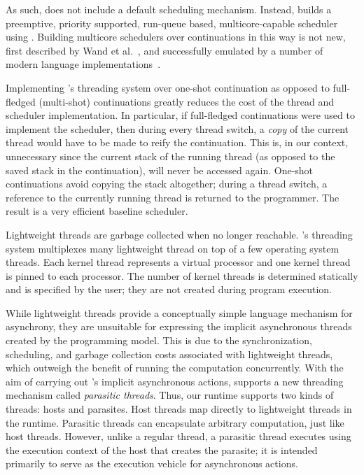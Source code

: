 As such,  does not include a default scheduling mechanism.
Instead, \MM builds a preemptive, priority supported, run-queue based,
multicore-capable scheduler using . Building multicore
schedulers over continuations in this way is not new, first described by Wand
et al.~\cite{ContMP}, and successfully emulated by a number of modern language
implementations~\cite{ghc,Auhagen11}.

Implementing \MM's threading system over one-shot continuation as opposed to
full-fledged (multi-shot) continuations greatly reduces the cost of the thread
and scheduler implementation. In particular, if full-fledged continuations were
used to implement the scheduler, then during every thread switch, a
\emph{copy} of the current thread would have to be made to reify the
continuation. This is, in our context, unnecessary since the current stack of
the running thread (as opposed to the saved stack in the continuation), will
never be accessed again.  One-shot continuations avoid
copying the stack altogether; during a thread switch, a reference to the
currently running thread is returned to the programmer. The result is a very
efficient baseline scheduler.

Lightweight threads are garbage collected when no longer reachable. \MM's
threading system multiplexes many lightweight thread on top of a few operating
system threads. Each kernel thread represents a virtual processor and one
kernel thread is pinned to each processor. The number of kernel threads is
determined statically and is specified by the user; they are not created during
program execution.

While lightweight threads provide a conceptually simple language mechanism for
asynchrony, they are unsuitable for expressing the implicit asynchronous
threads created by the \acml programming model. This is due to the
synchronization, scheduling, and garbage collection costs associated with
lightweight threads, which outweigh the benefit of running the computation
concurrently. With the aim of carrying out \acml's implicit asynchronous
actions, \MM supports a new threading mechanism called \emph{parasitic
threads}. Thus, our runtime supports two kinds of threads: hosts and parasites.
Host threads map directly to lightweight threads in the runtime. Parasitic
threads can encapsulate arbitrary computation, just like host threads. However,
unlike a regular thread, a parasitic thread executes using the execution
context of the host that creates the parasite; it is intended primarily to
serve as the execution vehicle for asynchronous actions.

